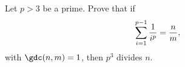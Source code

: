 Let $p > 3$ be a prime. Prove that if \[ \sum_{i=1 }^{p-1}{1\over i^p} = {n\over m},  \] with $\gdc(n,m) = 1$,  then $p^3$ divides $n$.